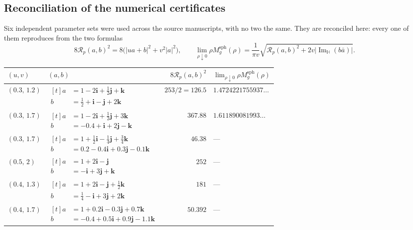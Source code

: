 \documentclass[11pt,a4paper]{article}
\numberwithin{equation}{section}
\theoremstyle{definition}
\theoremstyle{remark}
\theoremstyle{plain}
\newcommand{\HH}{\mathbb H}
\DeclareMathOperator{\Ima}{Im}
\newcommand{\ImH}{\Ima_{\HH}}
\newcommand{\Rp}{\mathcal R_{p}}      %
\newcommand{\Msph}{M^{\mathrm{sph}}}                  %
\newcommand{\abs}[1]{\lvert #1\rvert}
\begin{document}
\subsection{Reconciliation of the numerical certificates}
\label{f:sub:certificates}

Six independent parameter sets were used across the source manuscripts,
with no two the same. They are reconciled here: every one of them
reproduces from the two formulas
\[
 8\Rp(a,b)^2=8\bigl(\abs{ua+b}^2+v^2\abs a^2\bigr),
 \qquad
 \lim_{\rho\downarrow0}\rho\Msph_g(\rho)
 =\frac{1}{\pi v}\sqrt{\Rp(a,b)^2+2v\abs{\ImH(b\bar a)}} .
\]

\begin{center}
\small
\renewcommand{\arraystretch}{1.3}
\begin{tabular}{@{}l l r l@{}}
\toprule
$(u,v)$ & $(a,b)$ & $8\Rp(a,b)^2$ &
$\lim_{\rho\downarrow0}\rho\Msph_g(\rho)$\\
\midrule
$(0.3,\,1.2)$ &
$\begin{aligned}[t]
 a&=1-2\mathbf i+\tfrac12\mathbf j+\mathbf k\\[-2pt]
 b&=\tfrac12+\mathbf i-\mathbf j+2\mathbf k
\end{aligned}$ &
$253/2=126.5$ & $1.4724221755937\ldots$\\
$(0.3,\,1.7)$ &
$\begin{aligned}[t]
 a&=1-2\mathbf i+\tfrac12\mathbf j+3\mathbf k\\[-2pt]
 b&=-0.4+\mathbf i+2\mathbf j-\mathbf k
\end{aligned}$ &
$367.88$ & $1.611890081993\ldots$\\
$(0.3,\,1.7)$ &
$\begin{aligned}[t]
 a&=1+\tfrac12\mathbf i-\tfrac14\mathbf j+\tfrac34\mathbf k\\[-2pt]
 b&=0.2-0.4\mathbf i+0.3\mathbf j-0.1\mathbf k
\end{aligned}$ &
$46.38$ & ---\\
$(0.5,\,2)$ &
$\begin{aligned}[t]
 a&=1+2\mathbf i-\mathbf j\\[-2pt]
 b&=-\mathbf i+3\mathbf j+\mathbf k
\end{aligned}$ &
$252$ & ---\\
$(0.4,\,1.3)$ &
$\begin{aligned}[t]
 a&=1+2\mathbf i-\mathbf j+\tfrac12\mathbf k\\[-2pt]
 b&=\tfrac14-\mathbf i+3\mathbf j+2\mathbf k
\end{aligned}$ &
$181$ & ---\\
$(0.4,\,1.7)$ &
$\begin{aligned}[t]
 a&=1+0.2\mathbf i-0.3\mathbf j+0.7\mathbf k\\[-2pt]
 b&=-0.4+0.5\mathbf i+0.9\mathbf j-1.1\mathbf k
\end{aligned}$ &
$50.392$ & ---\\
\bottomrule
\end{tabular}
\end{center}
\end{document}
